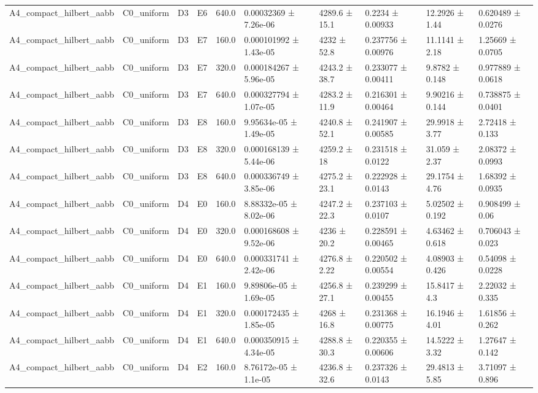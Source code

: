 \begin{table}
\begin{tabular}{llllllllll}
A4\_compact\_hilbert\_aabb & C0\_uniform & D3 & E6 & 640.0 & 0.00032369 ± 7.26e-06 & 4289.6 ± 15.1 & 0.2234 ± 0.00933 & 12.2926 ± 1.44 & 0.620489 ± 0.0276 \\
A4\_compact\_hilbert\_aabb & C0\_uniform & D3 & E7 & 160.0 & 0.000101992 ± 1.43e-05 & 4232 ± 52.8 & 0.237756 ± 0.00976 & 11.1141 ± 2.18 & 1.25669 ± 0.0705 \\
A4\_compact\_hilbert\_aabb & C0\_uniform & D3 & E7 & 320.0 & 0.000184267 ± 5.96e-05 & 4243.2 ± 38.7 & 0.233077 ± 0.00411 & 9.8782 ± 0.148 & 0.977889 ± 0.0618 \\
A4\_compact\_hilbert\_aabb & C0\_uniform & D3 & E7 & 640.0 & 0.000327794 ± 1.07e-05 & 4283.2 ± 11.9 & 0.216301 ± 0.00464 & 9.90216 ± 0.144 & 0.738875 ± 0.0401 \\
A4\_compact\_hilbert\_aabb & C0\_uniform & D3 & E8 & 160.0 & 9.95634e-05 ± 1.49e-05 & 4240.8 ± 52.1 & 0.241907 ± 0.00585 & 29.9918 ± 3.77 & 2.72418 ± 0.133 \\
A4\_compact\_hilbert\_aabb & C0\_uniform & D3 & E8 & 320.0 & 0.000168139 ± 5.44e-06 & 4259.2 ± 18 & 0.231518 ± 0.0122 & 31.059 ± 2.37 & 2.08372 ± 0.0993 \\
A4\_compact\_hilbert\_aabb & C0\_uniform & D3 & E8 & 640.0 & 0.000336749 ± 3.85e-06 & 4275.2 ± 23.1 & 0.222928 ± 0.0143 & 29.1754 ± 4.76 & 1.68392 ± 0.0935 \\
A4\_compact\_hilbert\_aabb & C0\_uniform & D4 & E0 & 160.0 & 8.88332e-05 ± 8.02e-06 & 4247.2 ± 22.3 & 0.237103 ± 0.0107 & 5.02502 ± 0.192 & 0.908499 ± 0.06 \\
A4\_compact\_hilbert\_aabb & C0\_uniform & D4 & E0 & 320.0 & 0.000168608 ± 9.52e-06 & 4236 ± 20.2 & 0.228591 ± 0.00465 & 4.63462 ± 0.618 & 0.706043 ± 0.023 \\
A4\_compact\_hilbert\_aabb & C0\_uniform & D4 & E0 & 640.0 & 0.000331741 ± 2.42e-06 & 4276.8 ± 2.22 & 0.220502 ± 0.00554 & 4.08903 ± 0.426 & 0.54098 ± 0.0228 \\
A4\_compact\_hilbert\_aabb & C0\_uniform & D4 & E1 & 160.0 & 9.89806e-05 ± 1.69e-05 & 4256.8 ± 27.1 & 0.239299 ± 0.00455 & 15.8417 ± 4.3 & 2.22032 ± 0.335 \\
A4\_compact\_hilbert\_aabb & C0\_uniform & D4 & E1 & 320.0 & 0.000172435 ± 1.85e-05 & 4268 ± 16.8 & 0.231368 ± 0.00775 & 16.1946 ± 4.01 & 1.61856 ± 0.262 \\
A4\_compact\_hilbert\_aabb & C0\_uniform & D4 & E1 & 640.0 & 0.000350915 ± 4.34e-05 & 4288.8 ± 30.3 & 0.220355 ± 0.00606 & 14.5222 ± 3.32 & 1.27647 ± 0.142 \\
A4\_compact\_hilbert\_aabb & C0\_uniform & D4 & E2 & 160.0 & 8.76172e-05 ± 1.1e-05 & 4236.8 ± 32.6 & 0.237326 ± 0.0143 & 29.4813 ± 5.85 & 3.71097 ± 0.896 \\

\end{tabular}
\end{table}
